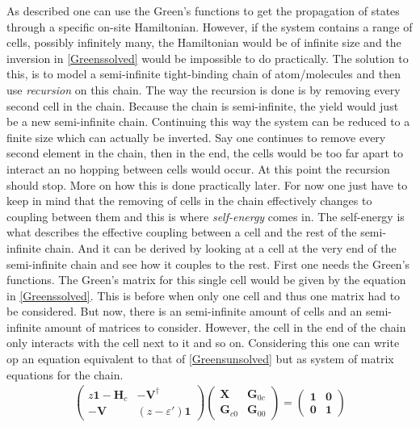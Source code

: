 As described  one can use the Green's functions to get the propagation of states through a specific on-site Hamiltonian. However, if the system contains a range of cells, possibly infinitely many, the Hamiltonian would be of infinite size and the inversion in \cref{Greenssolved} would be impossible to do practically. The solution to this, is to model a semi-infinite tight-binding chain of atom/molecules and then use \textit{recursion} on this chain. The way the recursion is done is by removing every second cell in the chain. Because the chain is semi-infinite, the yield would just be a new semi-infinite chain. Continuing this way the system can be reduced to a finite size which can actually be inverted. Say one continues to remove every second element in the chain, then in the end, the cells would be too far apart to interact an no hopping between cells would occur. At this point the recursion should stop. More on how this is done practically later.  For now one just have to keep in mind that the removing of cells in the chain effectively changes to coupling between them and this is where \textit{self-energy} comes in. The self-energy is what describes the effective coupling between a cell and the rest of the semi-infinite chain. And it can be derived by looking at a cell at the very end of the semi-infinite chain and see how it couples to the rest. First one needs the Green's functions. The Green's matrix for this single cell would be given by the equation in \cref{Greenssolved}. This is before when only one cell and thus one matrix had to be considered. But now, there is an semi-infinite amount of cells and an semi-infinite amount of matrices to consider. However, the cell in the end of the chain only interacts with the cell next to it and so on. Considering this one can write op an equation equivalent to that of \cref{Greensunsolved} but as system of matrix equations for the chain.
\begin{align}\label{Greenssystem}
	\begin{pmatrix}
		z\mathbf{1}-\mathbf{H}_c & -\mathbf{V}^{\dagger} \\ -\mathbf{V} & (z-\varepsilon')\mathbf{1}
	\end{pmatrix}
	\begin{pmatrix}
		\mathbf{X}      & \mathbf{G}_{0c} \\
		\mathbf{G}_{c0} & \mathbf{G}_{00}
	\end{pmatrix}
	=
	\begin{pmatrix}
		\mathbf{1} & \mathbf{0} \\
		\mathbf{0} & \mathbf{1}
	\end{pmatrix}
\end{align}
